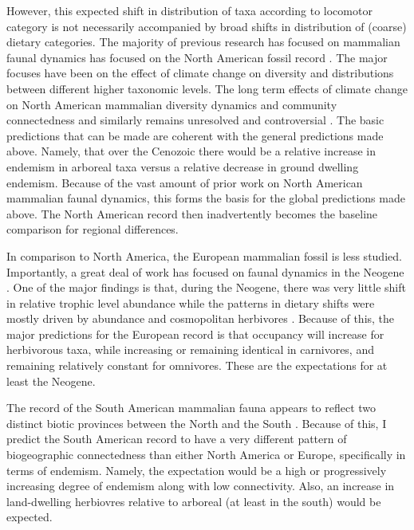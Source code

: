 \documentclass[12pt,letterpaper]{article}
\begin{document}
However, this expected shift in distribution of taxa according to locomotor category is not necessarily accompanied by broad shifts in distribution of (coarse) dietary categories. The majority of previous research has focused on mammalian faunal dynamics has focused on the North American fossil record \citep{Alroy2000g,Alroy1996a,Alroy1998,Barnosky2001a,Simpson1944,Simpson1953,Badgley2013,Blois2009,Figueirido2012,Gunnell1995,Hadly2001}. The major focuses have been on the effect of climate change on diversity and distributions between different higher taxonomic levels. The long term effects of climate change on North American mammalian diversity dynamics and community connectedness and similarly remains unresolved and controversial \citep{Alroy2000g,Blois2009,Figueirido2012,Barnosky2001a}. The basic predictions that can be made are coherent with the general predictions made above. Namely, that over the Cenozoic there would be a relative increase in endemism in arboreal taxa versus a relative decrease in ground dwelling endemism. Because of the vast amount of prior work on North American mammalian faunal dynamics, this forms the basis for the global predictions made above. The North American record then inadvertently becomes the baseline comparison for regional differences.

In comparison to North America, the European mammalian fossil is less studied. Importantly, a great deal of work has focused on faunal dynamics in the Neogene \citep{Jernvall2002,Jernvall2004,Liow2008,Raia2006,Raia2005,Raia2011c}. One of the major findings is that, during the Neogene, there was very little shift in relative trophic level abundance \citep{Jernvall2004} while the patterns in dietary shifts were mostly driven by abundance and cosmopolitan herbivores \citep{Jernvall2002}. Because of this, the major predictions for the European record is that occupancy will increase for herbivorous taxa, while increasing or remaining identical in carnivores, and remaining relatively constant for omnivores. These are the expectations for at least the Neogene.

The record of the South American mammalian fauna appears to reflect two distinct biotic provinces between the North and the South \citep{Macfadden1997,Macfadden2006,Flynn1998a,Patterson1968}. Because of this, I predict the South American record to have a very different pattern of biogeographic connectedness than either North America or Europe, specifically in terms of endemism. Namely, the expectation would be a high or progressively increasing degree of endemism along with low connectivity. Also, an increase in land-dwelling herbiovres relative to arboreal (at least in the south) would be expected.
\end{document}
